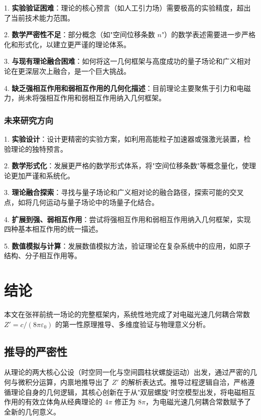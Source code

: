 \documentclass[a4paper,12pt]{article}
\theoremstyle{plain}
\begin{document}
1. \textbf{实验验证困难}：理论的核心预言（如人工引力场）需要极高的实验精度，超出了当前技术能力范围。

2. \textbf{数学严密性不足}：部分概念（如"空间位移条数 $n$"）的数学表述需要进一步严格化和形式化，以建立更严谨的理论体系。

3. \textbf{与现有理论融合困难}：如何将这一几何框架与高度成功的量子场论和广义相对论在更深层次上融合，是一个巨大挑战。

4. \textbf{缺乏强相互作用和弱相互作用的几何化描述}：目前理论主要聚焦于引力和电磁力，尚未将强相互作用和弱相互作用纳入几何框架。

\subsubsection{未来研究方向}

1. \textbf{实验设计}：设计更精密的实验方案，如利用高能粒子加速器或强激光装置，检验理论的独特预言。

2. \textbf{数学形式化}：发展更严格的数学形式体系，将"空间位移条数"等概念量化，使理论更加严谨和系统化。

3. \textbf{理论融合探索}：寻找与量子场论和广义相对论的融合路径，探索可能的交叉点，如将几何运动与量子场论中的场量子化结合。

4. \textbf{扩展到强、弱相互作用}：尝试将强相互作用和弱相互作用纳入几何框架，实现四种基本相互作用的统一描述。

5. \textbf{数值模拟与计算}：发展数值模拟方法，验证理论在复杂系统中的应用，如原子结构、分子相互作用等。

\section{结论}
本文在张祥前统一场论的完整框架内，系统性地完成了对电磁光速几何耦合常数 $Z' = c/(8\pi\varepsilon_0)$ 的第一性原理推导、多维度验证与物理意义分析。

\subsection{推导的严密性}
从理论的两大核心公设（时空同一化与空间圆柱状螺旋运动）出发，通过严密的几何与微积分运算，内禀地推导出了 $Z'$ 的解析表达式。推导过程逻辑自洽，严格遵循理论自身的几何逻辑，其核心创新在于从"双层螺旋"时空模型出发，将电磁相互作用的有效立体角从经典理论的 $4\pi$ 修正为 $8\pi$，为电磁光速几何耦合常数赋予了全新的几何意义。
\end{document}
